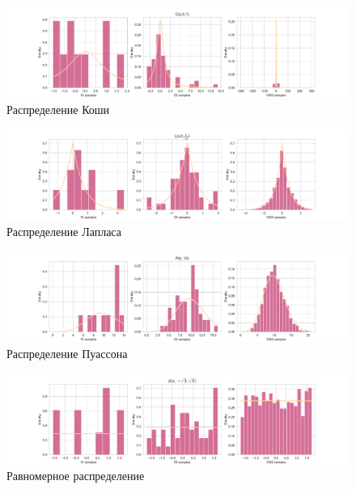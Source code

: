 \documentclass{article}
\begin{document}
\begin{figure}[H]
\begin{center}
\includegraphics[width = 18 cm]{images/koshi.pdf}\caption{Распределение Коши}\label{figure1}
\end{center}
\end{figure}

\begin{figure}[H]
\begin{center}
\includegraphics[width = 18 cm]{images/laplace.pdf}\caption{Распределение Лапласа}\label{figure1}
\end{center}
\end{figure}

\begin{figure}[H]
\begin{center}
\includegraphics[width = 18 cm]{images/poisson.pdf}\caption{Распределение Пуассона}\label{figure1}
\end{center}
\end{figure}

\begin{figure}[H]
\begin{center}
\includegraphics[width = 18 cm]{images/uniform.pdf}\caption{Равномерное распределение}\label{figure1}
\end{center}
\end{figure}
\end{document}
